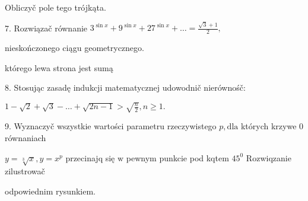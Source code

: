 \documentclass[a4paper,12pt]{article}
\begin{document}
Obliczyč pole tego trójkąta.

7. Rozwiązač równanie $3^{\sin x}+9^{\sin x}+27^{\sin x}+\ldots= \displaystyle \frac{\sqrt{3}+1}{2},$

nieskończonego ciągu geometrycznego.

którego lewa strona jest sumą

8. Stosując zasadę indukcji matematycznej udowodnič nierównośč:

$1-\sqrt{2}+\sqrt{3}-\ldots+\sqrt{2n-1}>\sqrt{\frac{n}{2}},n\geq 1.$

9. Wyznaczyč wszystkie wartości parametru rzeczywistego $p, \mathrm{d}\mathrm{l}\mathrm{a}$ których krzywe $0$ równaniach

$y=\sqrt[3]{x}, y=x^{p}$ przecinajq się $\mathrm{w}$ pewnym punkcie pod kqtem $45^{0}$ Rozwiqzanie zilustrowač

odpowiednim rysunkiem.
\end{document}
